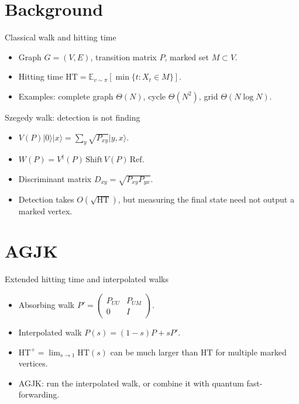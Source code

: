 \documentclass[aspectratio=169,11pt]{beamer}
\newcommand{\HT}{\mathrm{HT}}
\newcommand{\HTp}{\mathrm{HT}^{+}}
\begin{document}
\section{Background}

\begin{frame}{Classical walk and hitting time}
  \begin{itemize}
    \item Graph $G=(V,E)$, transition matrix $P$, marked set $M\subset V$.
    \item Hitting time $\HT=\mathbb{E}_{v\sim\pi}[\min\{t:X_t\in M\}]$.
    \item Examples: complete graph $\Theta(N)$, cycle $\Theta(N^2)$, grid $\Theta(N\log N)$.
  \end{itemize}
\end{frame}

\begin{frame}{Szegedy walk: detection is not finding}
  \begin{itemize}
    \item $V(P)|0\rangle|x\rangle=\sum_y\sqrt{P_{xy}}|y,x\rangle$.
    \item $W(P)=V^\dagger(P)\,\mathrm{Shift}\,V(P)\,\mathrm{Ref}$.
    \item Discriminant matrix $D_{xy}=\sqrt{P_{xy}P_{yx}}$.
    \item Detection takes $O(\sqrt{\HT})$, but measuring the final state need not output a marked vertex.
  \end{itemize}
\end{frame}

\section{AGJK}

\begin{frame}{Extended hitting time and interpolated walks}
  \begin{itemize}
    \item Absorbing walk $P'=\begin{pmatrix}P_{UU}&P_{UM}\\0&I\end{pmatrix}$.
    \item Interpolated walk $P(s)=(1-s)P+sP'$.
    \item $\HTp=\lim_{s\to1}\HT(s)$ can be much larger than $\HT$ for multiple marked vertices.
    \item AGJK: run the interpolated walk, or combine it with quantum fast-forwarding.
  \end{itemize}
\end{frame}
\end{document}

